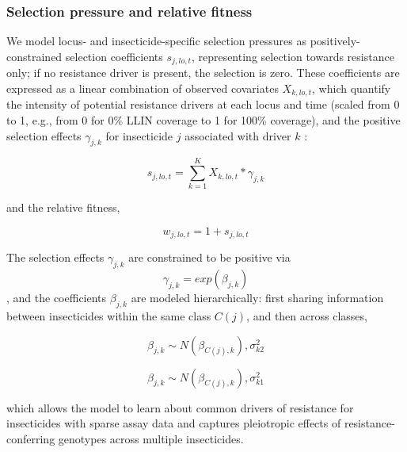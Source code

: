 \documentclass[
]{article}
\begin{document}
\subsubsection{Selection pressure and relative
fitness}\label{selection-pressure-and-relative-fitness}

We model locus- and insecticide-specific selection pressures as
positively-constrained selection coefficients \(s_{j,lo,t}\),
representing selection towards resistance only; if no resistance driver
is present, the selection is zero. These coefficients are expressed as a
linear combination of observed covariates \(X_{k,lo,t}\), which quantify
the intensity of potential resistance drivers at each locus and time
(scaled from 0 to 1, e.g., from 0 for 0\% LLIN coverage to 1 for 100\%
coverage), and the positive selection effects \(γ_{j,k}\) for
insecticide \(j\) associated with driver \(k\) :

\[
s_{j,lo,t} = \sum_{k=1}^{K} X_{k,lo,t} * γ_{j,k}
\]

and the relative fitness,

\[
w_{j,lo,t} = 1 + s_{j,lo,t}
\]

The selection effects \(γ_{j,k}\) are constrained to be positive via
\[ γ_{j,k} =e xp(β_{j,k})\], and the coefficients \(β_{j,k}\) are
modeled hierarchically: first sharing information between insecticides
within the same class \(C(j)\), and then across classes,

\[
β_{j,k} ∼ N(β_{C(j),k}), \sigma_{k2}^{2}
\]

\[
β_{j,k} ∼ N(β_{C(j),k}), \sigma_{k1}^{2}
\]

which allows the model to learn about common drivers of resistance for
insecticides with sparse assay data and captures pleiotropic effects of
resistance-conferring genotypes across multiple insecticides.
\end{document}
